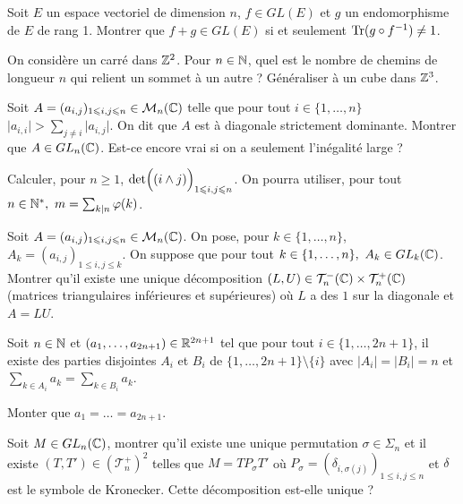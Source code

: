 \begin{exercise}
	Soit $E$ un espace vectoriel de dimension $n$, $f\in GL(E)$ et $g$ un
	endomorphisme de $E$ de rang 1. Montrer que $f+g\in GL(E)$ si et seulement
	$\operatorname{Tr}(g\circ f^{-1})\neq 1$.
\end{exercise}

\begin{exercise}
	On considère un carré dans $\mathbb{Z}^{2}$. Pour $n\in\mathbb{N}$, quel est le nombre de
	chemins de longueur $n$ qui relient un sommet à un autre ? Généraliser à un
	cube dans $\mathbb{Z}^{3}$.
\end{exercise}

\begin{exercise}
	Soit $A=(a_{i,j})_{1\leqslant i,j\leqslant n}\in\mathcal{M}_{n}(\mathbb{C})$ telle que pour
	tout $i\in\{1,\dots,n\}$$\vert a_{i,i}\vert>\sum_{j\neq i}\vert a_{i,j}\vert$.
	On dit que $A$ est à diagonale strictement dominante. Montrer que $A\in
	GL_{n}(\mathbb{C})$. Est-ce encore vrai si on a seulement l'inégalité large ?
\end{exercise}

\begin{exercise}
	Calculer, pour $n\geqslant1$, $\det\Bigl((i\wedge j)\Bigr)_{1\leqslant
	i,j\leqslant n}$. On pourra utiliser, pour tout $n\in\mathbb{N}^{*},~m=\sum_{k\mid
	n}\varphi(k)$.
\end{exercise}

\begin{exercise}
	Soit $A=(a_{i,j})_{1\leqslant i,j\leqslant n}\in\mathcal{M}_{n}(\mathbb{C})$. On pose, pour
	$k\in\{1,\dots, n\}$,$A_{k}=(a_{i,j})_{1\leqslant i,j\leqslant k}$. On suppose
	que pour tout $k\in\{1,\dots,n\},~A_{k}\in GL_{k}(\mathbb{C})$. Montrer qu'il existe
	une unique décomposition
	$(L,U)\in\mathcal{T}_{n}^{-}(\mathbb{C})\times\mathcal{T}_{n}^{+}(\mathbb{C})$ (matrices
	triangulaires inférieures et supérieures) où $L$ a des $1$ sur la diagonale et
	$A=LU$.
\end{exercise}

\begin{exercise}
	Soit $n\in\mathbb{N}$ et $(a_{1},\dots,a_{2n+1})\in\mathbb{R}^{2n+1}$ tel que pour tout
	$i\in\{1,\dots,2n+1\}$, il existe des parties disjointes $A_{i}$ et $B_{i}$ de
	$\{1,\dots,2n+1\}\setminus\{i\}$ avec $\vert A_{i}\vert=\vert B_{i}\vert=n$ et
	$\sum_{k\in A_{i}}a_{k}=\sum_{k\in B_{i}}a_{k}$.

	Monter que $a_{1}=\dots=a_{2n+1}$.
\end{exercise}

\begin{exercise}
	Soit $M\in GL_{n}(\mathbb{C})$, montrer qu'il existe une unique permutation
	$\sigma\in\Sigma_{n}$ et il existe $(T,T')\in(\mathcal{T}_{n}^{+})^{2}$ telles
	que $M=TP_{\sigma}T'$ où $P_{\sigma}=(\delta_{i,\sigma(j)})_{1\leqslant
	i,j\leqslant n}$ et $\delta$ est le symbole de Kronecker. Cette décomposition
	est-elle unique ?
\end{exercise}

